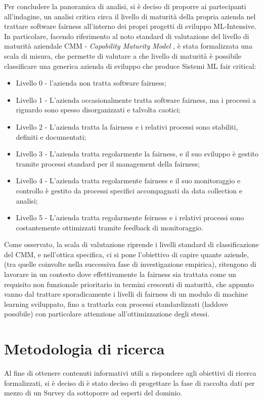      Per concludere la panoramica di analisi, si è deciso di proporre ai partecipanti all'indagine, un analisi critica circa il livello di maturità della propria azienda nel trattare software fairness all'interno dei propri progetti di sviluppo ML-Intensive. In particolare, facendo riferimento al noto standard di valutazione del livello di maturità aziendale CMM - \emph{Capability Maturity Model} \cite{CMM}, è stata formalizzata una scala di misura, che permette di valutare a che livello di maturità è possibile classificare una generica azienda di sviluppo che produce Sistemi ML fair critical:
     
     \begin{itemize}
     	\item Livello 0 - l'azienda non tratta software fairness;
     	\item Livello 1 - L'azienda occasionalmente tratta software fairness, ma i processi a riguardo sono spesso disorganizzati e talvolta caotici;
     	\item Livello 2 - L'azienda tratta la fairness e i relativi processi sono stabiliti, definiti e documentati;
     	\item Livello 3 - L'azienda tratta regolarmente la fairness, e il suo sviluppo è gestito tramite processi standard per il management della fairness;
     	\item Livello 4 - L'azienda tratta regolarmente fairness e il suo monitoraggio e controllo è gestito da processi specifici accompagnati da data collection e analisi;
     	\item Livello 5 - L'azienda tratta regolarmente feirness e i relativi processi sono costantemente ottimizzati tramite feedback di monitoraggio.
     \end{itemize}
 
 	Come osservato, la scala di valutazione riprende i livelli standard di classificazione del CMM, e nell'ottica specifica, ci si pone l'obiettivo di capire quante aziende, (tra quelle coinvolte nella successiva fase di investigazione empirica), ritengono di lavorare in un contesto dove effettivamente la fairness sia trattata come un requisito non funzionale prioritario in termini crescenti di maturità, che appunto vanno dal trattare sporadicamente i livelli di fairness di un modulo di machine learning sviluppato, fino a trattarla con processi standardizzati (laddove possibile) con particolare attenzione all'ottimizzazione degli stessi.
    
    \section{Metodologia di ricerca}
     Al fine di ottenere contenuti informativi utili a rispondere agli obiettivi di ricerca formalizzati, si è deciso di è stato deciso di progettare la fase di raccolta dati per mezzo di un Survey da sottoporre ad esperti del dominio.\\\\
     

